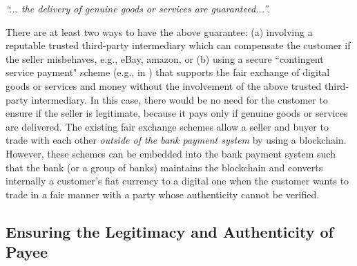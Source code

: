  
\begin{center}\textit{``... the delivery of genuine goods or services are guaranteed...''.}
 \end{center}
 
There are at least two ways to have the above guarantee: (a) involving a reputable trusted third-party intermediary which can compensate the customer if the seller misbehaves, e.g., eBay, amazon, or (b)  using a secure ``contingent service payment" scheme (e.g., in  \cite{CampanelliGGN17}) that supports the  fair exchange of digital goods or services and money without the involvement of the above trusted third-party intermediary. In this case, there would be no need for the customer to ensure if the seller is legitimate, because it pays only if  genuine goods or services are delivered. The existing fair exchange schemes  allow a seller and buyer to trade with each other \emph{outside of the bank payment system} by using a blockchain. However, these schemes can be embedded into the bank payment system such that the bank (or a group of banks) maintains the blockchain and converts internally  a customer's  fiat currency  to a digital one when the customer wants to trade in a fair manner with a party whose authenticity cannot be verified. 


\subsection{Ensuring the Legitimacy and Authenticity of Payee}

